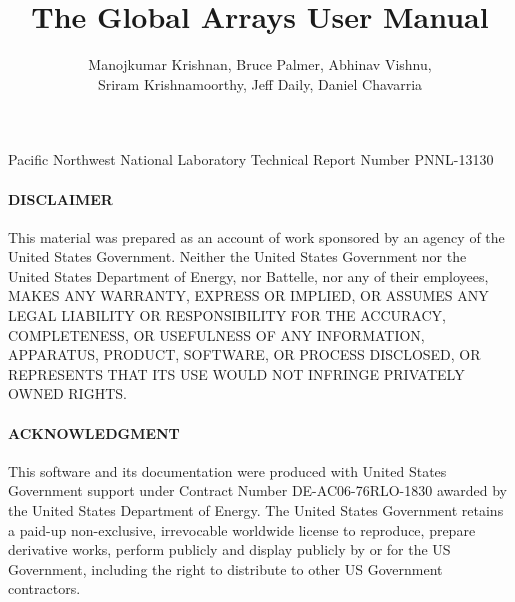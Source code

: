 \documentclass[oneside,english]{book}
\begin{document}
\title{The Global Arrays User Manual}

\author{Manojkumar Krishnan, Bruce Palmer, Abhinav Vishnu, \\
Sriram Krishnamoorthy, Jeff Daily, Daniel Chavarria}

\maketitle

\begin{center}
Pacific Northwest National Laboratory Technical Report Number PNNL-13130
\par\end{center}

\paragraph{DISCLAIMER}

This material was prepared as an account of work sponsored by an agency of the United States Government. Neither the United States Government nor the United States Department of Energy, nor Battelle, nor any of their employees, MAKES ANY WARRANTY, EXPRESS OR IMPLIED, OR ASSUMES ANY LEGAL LIABILITY OR RESPONSIBILITY FOR THE ACCURACY, COMPLETENESS, OR USEFULNESS OF ANY INFORMATION, APPARATUS, PRODUCT, SOFTWARE, OR PROCESS DISCLOSED, OR REPRESENTS THAT ITS USE WOULD NOT INFRINGE PRIVATELY OWNED RIGHTS.

\paragraph{ACKNOWLEDGMENT}

This software and its documentation were produced with United States Government support under Contract Number DE-AC06-76RLO-1830 awarded by the United States Department of Energy. The United States Government retains a paid-up non-exclusive, irrevocable worldwide license to reproduce, prepare derivative works, perform publicly and display publicly by or for the US Government, including the right to distribute to other US Government contractors. 

\tableofcontents{}



% 
\end{document}
